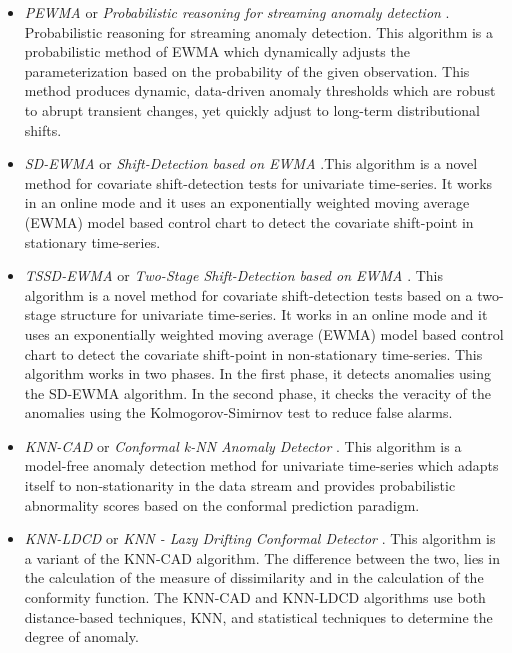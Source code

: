 \documentclass[a4paper]{article}\usepackage[]{graphicx}\usepackage[]{color}
\begin{document}
\begin{itemize}
\item \emph{PEWMA} or \emph{Probabilistic reasoning for streaming anomaly detection} \cite{pewma}. Probabilistic reasoning for streaming anomaly detection. This algorithm is a probabilistic method of EWMA which dynamically adjusts the parameterization based on the probability of the given observation. This method produces dynamic, data-driven anomaly thresholds which are robust to abrupt transient changes, yet quickly adjust to long-term distributional shifts.

\item \emph{SD-EWMA} or \emph{Shift-Detection based on EWMA} \cite{Raza}.This algorithm is a novel method for covariate shift-detection tests for univariate time-series. It works in an online mode and it uses an exponentially weighted moving average (EWMA) model based control chart to detect the covariate shift-point in stationary time-series.

\item \emph{TSSD-EWMA} or \emph{Two-Stage Shift-Detection based on EWMA} \cite{Raza}. This algorithm is a novel method for covariate shift-detection tests based on a two-stage structure for univariate time-series. It works in an online mode and it uses an exponentially weighted moving average (EWMA) model based control chart to detect the covariate shift-point in non-stationary time-series. This algorithm works in two phases. In the first phase, it detects anomalies using the SD-EWMA algorithm. In the second phase, it checks the veracity of the anomalies using the Kolmogorov-Simirnov test to reduce false alarms.

\item \emph{KNN-CAD} or \emph{Conformal k-NN Anomaly Detector} \cite{2016arXiv160804585B}. This algorithm is a model-free anomaly detection method for univariate time-series which adapts itself to non-stationarity in the data stream and provides probabilistic abnormality scores based on the conformal prediction paradigm.

\item \emph{KNN-LDCD} or \emph{KNN - Lazy Drifting Conformal Detector}  \cite{2017arXiv170603412I}. This algorithm is a variant of the KNN-CAD algorithm. The difference between the two, lies in the calculation of the measure of dissimilarity and in the calculation of the conformity function. The KNN-CAD and KNN-LDCD algorithms use both distance-based techniques, KNN, and statistical techniques to determine the degree of anomaly.
\end{itemize}
\end{document}
